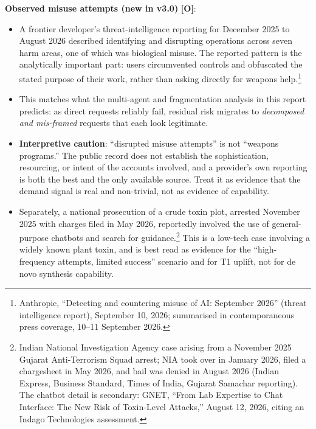 \documentclass[11pt,letterpaper]{article}
\begin{document}
\textbf{Observed misuse attempts (new in v3.0)} \textbf{[O]}:
\begin{itemize}[nosep]
  \item A frontier developer's threat-intelligence reporting for December 2025 to August 2026 described identifying and disrupting operations across seven harm areas, one of which was biological misuse. The reported pattern is the analytically important part: users circumvented controls and obfuscated the stated purpose of their work, rather than asking directly for weapons help.\footnote{Anthropic, ``Detecting and countering misuse of AI: September 2026'' (threat intelligence report), September 10, 2026; summarised in contemporaneous press coverage, 10--11 September 2026.}
  \item This matches what the multi-agent and fragmentation analysis in this report predicts: as direct requests reliably fail, residual risk migrates to \textit{decomposed and mis-framed} requests that each look legitimate.
  \item \textbf{Interpretive caution}: ``disrupted misuse attempts'' is not ``weapons programs.'' The public record does not establish the sophistication, resourcing, or intent of the accounts involved, and a provider's own reporting is both the best and the only available source. Treat it as evidence that the demand signal is real and non-trivial, not as evidence of capability.
  \item Separately, a national prosecution of a crude toxin plot, arrested November 2025 with charges filed in May 2026, reportedly involved the use of general-purpose chatbots and search for guidance.\footnote{Indian National Investigation Agency case arising from a November 2025 Gujarat Anti-Terrorism Squad arrest; NIA took over in January 2026, filed a chargesheet in May 2026, and bail was denied in August 2026 (Indian Express, Business Standard, Times of India, Gujarat Samachar reporting). The chatbot detail is secondary: GNET, ``From Lab Expertise to Chat Interface: The New Risk of Toxin-Level Attacks,'' August 12, 2026, citing an Indago Technologies assessment.} This is a low-tech case involving a widely known plant toxin, and is best read as evidence for the ``high-frequency attempts, limited success'' scenario and for T1 uplift, not for de novo synthesis capability.
\end{itemize}
\end{document}
